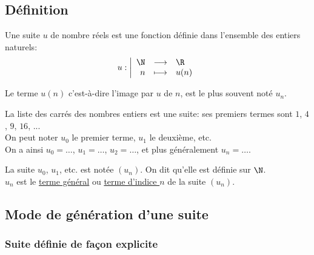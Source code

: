 \documentclass[a4paper]{article}
\begin{document}
\subsection{Définition}
\begin{definition}{}{}
	Une suite $u$ de nombre réels est une fonction définie dans l'ensemble des entiers naturels:
  \begin{displaymath}
    u:
    \left|
      \begin{array}{rcl}
        \N & \longrightarrow &\R \\
        n & \longmapsto & u(n) \\
      \end{array}
    \right.
    \end{displaymath}

  Le terme $u(n)$ c'est-à-dire l'image par $u$ de $n$, est le plus souvent noté $u_n$.

\end{definition}

\begin{example}{}{}
	La liste des carrés des nombres entiers est une suite: ses premiers termes sont $1$, $4$, $9$, $16$, ...\\
	On peut noter $u_0$ le premier terme, $u_1$ le deuxième, etc.\\
	On a ainsi $u_0=\ldots$, $u_1=\ldots$, $u_2=\ldots$, et plus généralement $u_n=\ldots$.
\end{example}

\begin{vocabulaire}{}{}
		La suite $u_0$, $u_1$, etc. est notée $(u_n)$. On dit qu'elle est définie sur $\N$.\\
		$u_n$ est le \underline{terme général} ou \underline{terme d'indice $n$} de la suite $(u_n)$.
\end{vocabulaire}

\subsection{Mode de génération d'une suite}
	\subsubsection{Suite définie de façon explicite}
\end{document}
